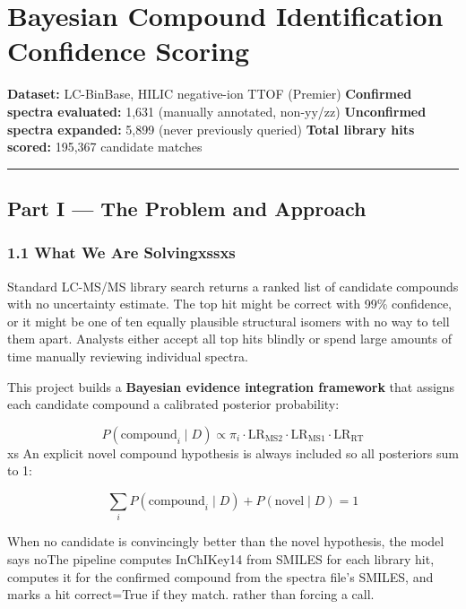 \section{Bayesian Compound Identification Confidence
Scoring}\label{bayesian-compound-identification-confidence-scoring}

\textbf{Dataset:} LC-BinBase, HILIC negative-ion TTOF (Premier)
\textbf{Confirmed spectra evaluated:} 1,631 (manually annotated,
non-yy/zz) \textbf{Unconfirmed spectra expanded:} 5,899 (never
previously queried) \textbf{Total library hits scored:} 195,367
candidate matches

\begin{center}\rule{0.5\linewidth}{0.5pt}\end{center}

\subsection{Part I --- The Problem and
Approach}\label{part-i-the-problem-and-approach}

\subsubsection{1.1 What We Are
Solvingxssxs}\label{what-we-are-solvingxssxs}

Standard LC-MS/MS library search returns a ranked list of candidate
compounds with no uncertainty estimate. The top hit might be correct
with 99\% confidence, or it might be one of ten equally plausible
structural isomers with no way to tell them apart. Analysts either
accept all top hits blindly or spend large amounts of time manually
reviewing individual spectra.

This project builds a \textbf{Bayesian evidence integration framework}
that assigns each candidate compound a calibrated posterior probability:

\[P(\text{compound}_i \mid D) \propto \pi_i \cdot \text{LR}_{\text{MS2}} \cdot \text{LR}_{\text{MS1}} \cdot \text{LR}_{\text{RT}}\]
xs An explicit novel compound hypothesis is always included so all
posteriors sum to 1:

\[\sum_i P(\text{compound}_i \mid D) + P(\text{novel} \mid D) = 1\]

When no candidate is convincingly better than the novel hypothesis, the
model says noThe pipeline computes InChIKey14 from SMILES for each
library hit, computes it for the confirmed compound from the spectra
file's SMILES, and marks a hit correct=True if they match. rather than
forcing a call.

